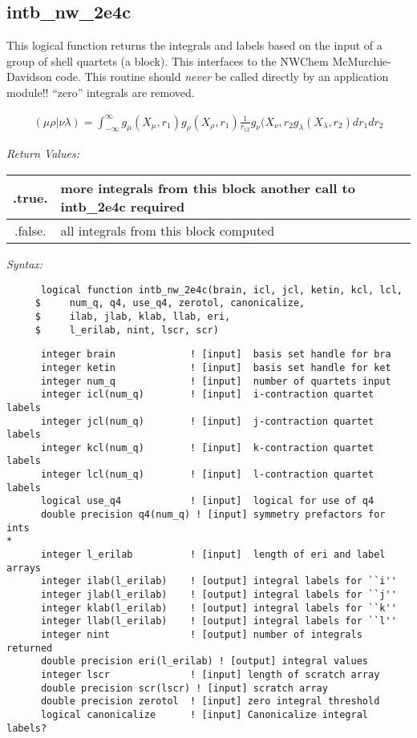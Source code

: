 \subsection{intb\_nw\_2e4c} 
This logical function returns the integrals and labels based on the 
input of a group of shell quartets (a block).  This interfaces to 
the NWChem McMurchie-Davidson code.  This routine should {\it never} 
be called directly by an application module!! 
``zero'' integrals are removed. 
 
\begin{eqnarray*} 
({\mu}{\rho}|{\nu}{\lambda}) = \int_{-\infty}^{\infty} g_{\mu}(X_{\mu},r_{1})g_{\rho}(X_{\rho},r_{1})\frac{1}{r_{12}}g_{\nu}
(X_{\nu},r_{2}g_{\lambda}(X_{\lambda},r_{2})dr_{1}dr_{2} 
\end{eqnarray*} 
 
{\it Return Values:} 
\begin{tabular}{|c|p{60mm}|} \hline 
 .true.  & more integrals from this block another call to intb\_2e4c required \\ \hline 
 .false. & all integrals from this block computed\\ \hline 
\end{tabular} 
 
{\it Syntax:} 
\begin{verbatim} 
      logical function intb_nw_2e4c(brain, icl, jcl, ketin, kcl, lcl, 
     $     num_q, q4, use_q4, zerotol, canonicalize, 
     $     ilab, jlab, klab, llab, eri, 
     $     l_erilab, nint, lscr, scr) 
\end{verbatim} 
\begin{verbatim} 
      integer brain             ! [input]  basis set handle for bra  
      integer ketin             ! [input]  basis set handle for ket  
      integer num_q             ! [input]  number of quartets input 
      integer icl(num_q)        ! [input]  i-contraction quartet labels 
      integer jcl(num_q)        ! [input]  j-contraction quartet labels 
      integer kcl(num_q)        ! [input]  k-contraction quartet labels 
      integer lcl(num_q)        ! [input]  l-contraction quartet labels 
      logical use_q4            ! [input]  logical for use of q4 
      double precision q4(num_q) ! [input] symmetry prefactors for ints 
*      
      integer l_erilab          ! [input]  length of eri and label arrays 
      integer ilab(l_erilab)    ! [output] integral labels for ``i''  
      integer jlab(l_erilab)    ! [output] integral labels for ``j''  
      integer klab(l_erilab)    ! [output] integral labels for ``k''  
      integer llab(l_erilab)    ! [output] integral labels for ``l''  
      integer nint              ! [output] number of integrals returned 
      double precision eri(l_erilab) ! [output] integral values 
      integer lscr              ! [input] length of scratch array 
      double precision scr(lscr) ! [input] scratch array 
      double precision zerotol  ! [input] zero integral threshold 
      logical canonicalize      ! [input] Canonicalize integral labels? 
\end{verbatim} 
